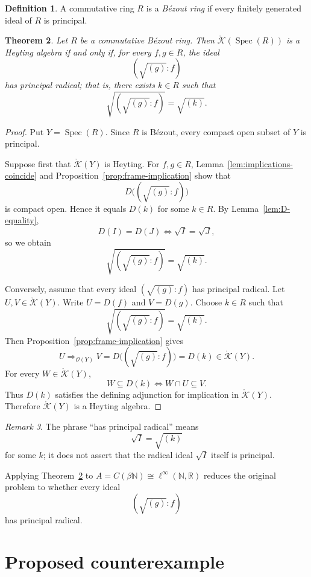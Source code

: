\documentclass{amsart}
\newtheorem{theorem}{Theorem}
\theoremstyle{definition}
\newtheorem{definition}[theorem]{Definition}
\theoremstyle{remark}
\newtheorem{remark}[theorem]{Remark}
\newcommand{\Spec}[1]{\operatorname{Spec}\left(#1\right)}
\newcommand{\nat}{\mathbb N}
\newcommand{\reals}{\mathbb R}
\newcommand{\Op}[1]{\mathcal{O}\left(#1\right)}
\newcommand{\cont}[1]{C\left(#1\right)}
\newcommand{\KOp}[1]{\mathring{\mathcal{K}}\left(#1\right)}
\newcommand{\linfty}{\ell^\infty}
\begin{document}
\begin{definition}\label{def:bezout-ring}
A commutative ring $R$ is a \emph{B\'ezout ring} if every finitely
generated ideal of $R$ is principal.
\end{definition}

\begin{theorem}\label{thm:bezout-criterion}
Let $R$ be a commutative B\'ezout ring. Then $\KOp{\Spec{R}}$ is a Heyting
algebra if and only if, for every $f,g\in R$, the ideal
\[
(\sqrt{(g)}:f)
\]
has principal radical; that is, there exists $k\in R$ such that
\[
\sqrt{(\sqrt{(g)}:f)}=\sqrt{(k)}.
\]
\end{theorem}

\begin{proof}
Put $Y=\Spec{R}$. Since $R$ is B\'ezout, every compact open subset of $Y$ is
principal.

Suppose first that $\KOp{Y}$ is Heyting. For $f,g\in R$,
Lemma~\ref{lem:implications-coincide} and
Proposition~\ref{prop:frame-implication} show that
\[
D\bigl((\sqrt{(g)}:f)\bigr)
\]
is compact open. Hence it equals $D(k)$ for some $k\in R$. By
Lemma~\ref{lem:D-equality},
\[
D(I)=D(J)\iff\sqrt I=\sqrt J,
\]
so we obtain
\[
\sqrt{(\sqrt{(g)}:f)}=\sqrt{(k)}.
\]

Conversely, assume that every ideal $(\sqrt{(g)}:f)$ has principal radical.
Let $U,V\in\KOp{Y}$. Write $U=D(f)$ and $V=D(g)$. Choose $k\in R$ such that
\[
\sqrt{(\sqrt{(g)}:f)}=\sqrt{(k)}.
\]
Then Proposition~\ref{prop:frame-implication} gives
\[
U\Rightarrow_{\Op{Y}}V
=D\bigl((\sqrt{(g)}:f)\bigr)
=D(k)\in\KOp{Y}.
\]
For every $W\in\KOp{Y}$,
\[
W\subseteq D(k)
\iff
W\cap U\subseteq V.
\]
Thus $D(k)$ satisfies the defining adjunction for implication in $\KOp{Y}$.
Therefore $\KOp{Y}$ is a Heyting algebra.
\end{proof}

\begin{remark}
The phrase ``has principal radical'' means
\[
\sqrt I=\sqrt{(k)}
\]
for some $k$; it does not assert that the radical ideal $\sqrt I$ itself is
principal.
\end{remark}

Applying Theorem~\ref{thm:bezout-criterion} to
$A=\cont{\beta\nat}\cong\linfty(\nat,\reals)$ reduces the original problem to
whether every ideal
\[
(\sqrt{(g)}:f)
\]
has principal radical.

\section{Proposed counterexample}
\label{sec:proposed-counterexample}
\end{document}
